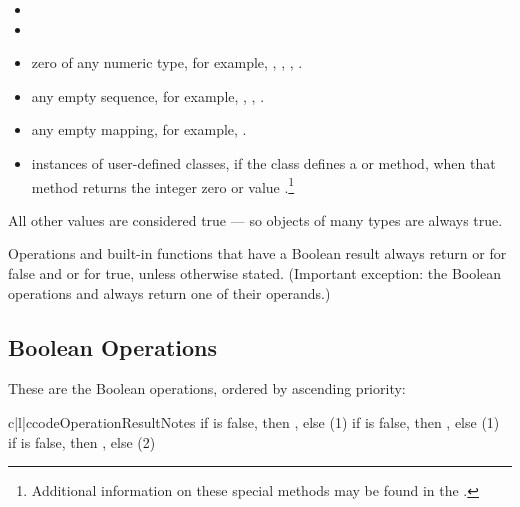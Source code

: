 \begin{itemize}

\item	{}

\item	{}

\item	zero of any numeric type, for example, , ,
        , .

\item	any empty sequence, for example, , \code{()}, \code{[]}.

\item	any empty mapping, for example, \code{\{\}}.

\item	instances of user-defined classes, if the class defines a
         or  method, when that
        method returns the integer zero or  value
        .\footnote{Additional 
information on these special methods may be found in the
.}

\end{itemize}

All other values are considered true --- so objects of many types are
always true.

Operations and built-in functions that have a Boolean result always
return  or  for false and  or 
for true, unless otherwise stated.  (Important exception: the Boolean
operations  and  always
return one of their operands.)

\subsection{Boolean Operations \label{boolean}}

These are the Boolean operations, ordered by ascending priority:

\begin{tableiii}{c|l|c}{code}{Operation}{Result}{Notes}
          {if  is false, then , else }{(1)}
          {if  is false, then , else }{(1)}
  \hline
          {if  is false, then , else }{(2)}
\end{tableiii}

